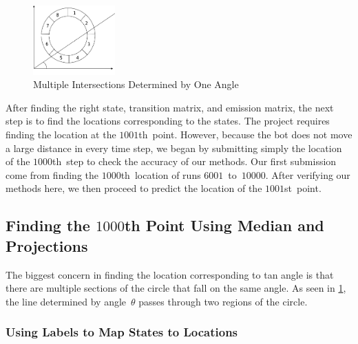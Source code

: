 \documentclass[twoside]{article}
\begin{document}
\begin{figure}
  \begin{center}
    \includegraphics[width=0.28\textwidth]{images/two-intersection}
    \caption[multi-intersect]{Multiple Intersections Determined by One Angle}\label{fig:multi-intersect}
  \end{center}
\end{figure}
After finding the right state, transition matrix, and emission matrix, the next step is to find the locations corresponding to the states.
The project requires finding the location at the $\num{1001}$th~point.
However, because the bot does not move a large distance in every time step, we began by submitting simply the location of the $\num{1000}$th~step to check the accuracy of our methods.
Our first submission come from finding the $\num{1000}$th~location of runs $\num{6001}$~to~$\num{10000}$.
After verifying our methods here, we then proceed to predict the location of the $\num{1001}$st~point.

\subsection{Finding the $\num{1000}$th Point Using Median and Projections}\label{sec:find-num1000th-point}

The biggest concern in finding the location corresponding to tan angle is that there are multiple sections of the circle that fall on the same angle.
As seen in \cref{fig:multi-intersect}, the line determined by angle~$\theta$ passes through two regions of the circle.

\subsubsection{Using Labels to Map States to Locations}\label{sec:using-labels-map}
\end{document}
